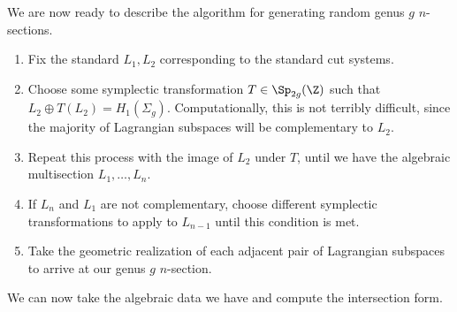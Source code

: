 We are now ready to describe the algorithm for generating random genus $g$ $n$-sections.
\begin{enumerate}
	\item Fix the standard $L_1,L_2$ corresponding to the standard cut systems.
	\item Choose some symplectic transformation $T \in \Sp_{2g}(\Z)$ such that $L_2 \oplus T(L_2) = H_1(\Sigma_g)$. Computationally, this is not terribly difficult, since the majority of Lagrangian subspaces will be complementary to $L_2$.
	\item Repeat this process with the image of $L_2$ under $T$, until we have the algebraic multisection $L_1, \dots, L_n$.
	\item If $L_n$ and $L_1$ are not complementary, choose different symplectic transformations to apply to $L_{n - 1}$ until this condition is met.
	\item Take the geometric realization of each adjacent pair of Lagrangian subspaces to arrive at our genus $g$ $n$-section.
\end{enumerate}

We can now take the algebraic data we have and compute the intersection form.

